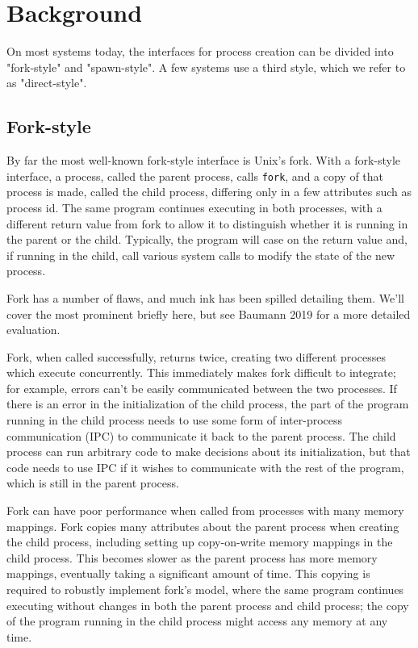 \documentclass[sigplan]{acmart}
\begin{document}
\section{Background}\label{background}
On most systems today,
the interfaces for process creation
can be divided into "fork-style" and "spawn-style".
A few systems use a third style, which we refer to as "direct-style".
\subsection{Fork-style}
By far the most well-known fork-style interface is Unix's fork.\cite{forkhist}
With a fork-style interface,
a process, called the parent process, calls \texttt{fork},
and a copy of that process is made,
called the child process,
differing only in a few attributes such as process id.
The same program continues executing in both processes,
with a different return value from fork to allow it to distinguish whether it is running in the parent or the child.
Typically, the program will case on the return value
and, if running in the child,
call various system calls to modify the state of the new process.

Fork has a number of flaws,
and much ink has been spilled detailing them.
We'll cover the most prominent briefly here,
but see Baumann 2019 \cite{forkroad} for a more detailed evaluation.

Fork, when called successfully, returns twice,
creating two different processes which execute concurrently.
This immediately makes fork difficult to integrate;
for example, errors can't be easily communicated between the two processes.
If there is an error in the initialization of the child process,
the part of the program running in the child process
needs to use some form of inter-process communication (IPC) to communicate it back to the parent process.
The child process can run arbitrary code to make decisions about its initialization,
but that code needs to use IPC if it wishes to communicate with the rest of the program,
which is still in the parent process.

Fork can have poor performance when called from processes with many memory mappings.\cite{forkroad}
Fork copies many attributes about the parent process when creating the child process,
including setting up copy-on-write memory mappings in the child process.
This becomes slower as the parent process has more memory mappings,
eventually taking a significant amount of time.
This copying is required to robustly implement fork's model,
where the same program continues executing without changes in both the parent process and child process;
the copy of the program running in the child process might access any memory at any time.
\end{document}
